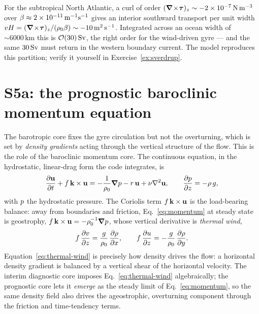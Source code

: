 \begin{example}
For the subtropical North Atlantic, a curl of order
$(\boldsymbol{\nabla}\!\times\!\boldsymbol\tau)_z\sim-2\times10^{-7}\,\mathrm{N\,m^{-3}}$ over
$\beta\approx2\times10^{-11}\,\mathrm{m^{-1}s^{-1}}$ gives an interior southward transport per unit
width $vH=(\boldsymbol{\nabla}\!\times\!\boldsymbol\tau)_z/(\rho_0\beta)\sim-10\,\mathrm{m^2\,s^{-1}}$. Integrated across
an ocean width of $\sim6000\,\mathrm{km}$ this is $\mathcal O(30)\,\mathrm{Sv}$, the right order for the
wind-driven gyre --- and the same $30\,\mathrm{Sv}$ must return in the western boundary current. The model
reproduces this partition; verify it yourself in Exercise~\ref{ex:sverdrup}.
\end{example}

\section{S5a: the prognostic baroclinic momentum equation}\label{sec:s5a}

The barotropic core fixes the gyre circulation but not the overturning, which is set by
\emph{density gradients} acting through the vertical structure of the flow. This is the role of
the baroclinic momentum core. The continuous equation, in the hydrostatic, linear-drag form the
code integrates, is
\begin{equation}\label{eq:momentum}
  \frac{\partial \mathbf{u}}{\partial t}+f\,\mathbf{k}\times\mathbf{u}
  =-\frac{1}{\rho_0}\boldsymbol{\nabla}p-r\,\mathbf{u}+\nu\nabla^{2}\mathbf{u},
  \qquad \frac{\partial p}{\partial z}=-\rho\,g ,
\end{equation}
with $p$ the hydrostatic pressure. The Coriolis term $f\,\mathbf{k}\times\mathbf{u}$ is the
load-bearing balance: away from boundaries and friction, Eq.~\eqref{eq:momentum} at steady state
is geostrophy, $f\,\mathbf{k}\times\mathbf{u}=-\rho_0^{-1}\boldsymbol{\nabla}p$, whose vertical derivative is
\emph{thermal wind},
\begin{equation}\label{eq:thermal-wind}
  f\,\frac{\partial v}{\partial z}=\frac{g}{\rho_0}\,\frac{\partial \rho}{\partial x},\qquad
  f\,\frac{\partial u}{\partial z}=-\frac{g}{\rho_0}\,\frac{\partial \rho}{\partial y}.
\end{equation}
Equation~\eqref{eq:thermal-wind} is precisely how density drives the flow: a horizontal density
gradient is balanced by a vertical shear of the horizontal velocity. The interim diagnostic core
imposes Eq.~\eqref{eq:thermal-wind} algebraically; the prognostic core lets it \emph{emerge} as
the steady limit of Eq.~\eqref{eq:momentum}, so the same density field also drives the
ageostrophic, overturning component through the friction and time-tendency terms.

